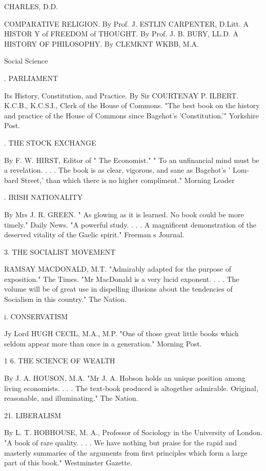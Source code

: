 \documentclass[12pt,leqno]{book}[2005/09/16]
\begin{document}
CHARLES, D.D.

COMPARATIVE RELIGION. By Prof. J. ESTLIN CARPENTER, D.Litt.
A HISTOR Y of FREEDOM of THOUGHT. By Prof. J. B. BURY, LL.D.
A HISTORY OF PHILOSOPHY. By CLEMKNT WKBB, M.A.



Social Science



. PARLIAMENT

Its History, Constitution, and Practice. By Sir COURTENAY P. ILBERT.
K.C.B., K.C.S.I., Clerk of the House of Commons. "The best book on the
history and practice of the House of Commons since Bagehot's 'Constitution.'"
Yorkshire Post.

. THE STOCK EXCHANGE

By F. W. HIRST, Editor of " The Economist." " To an unfinancial mind must
be a revelation. . . . The book is as clear, vigorous, and sane as Bagehot's ' Lom-
bard Street,' than which there is no higher compliment." Morning Leader

. IRISH NATIONALITY

By Mrs J. R. GREEN. " As glowing as it is learned. No book could be more
timely." Daily News. "A powerful study. . . . A magnificent demonstration
of the deserved vitality of the Gaelic spirit." Freeman s Journal.

3. THE SOCIALIST MOVEMENT

RAMSAY MACDONALD, M.T. "Admirably adapted for the purpose of
exposition." The Times. "Mr MacDonald is a very lucid exponent. . . . The
volume will be of great use in dispelling illusions about the tendencies of
Socialism in this country." The Nation.

i. CONSERVATISM

Jy Lord HUGH CECIL, M.A., M.P. "One of those great little books which
seldom appear more than once in a generation." Morning Post.



1 6. THE SCIENCE OF WEALTH

By J. A. HOUSON, M.A. "Mr J. A. Hobson holds an unique position among
living economists. . . . The text-book produced is altogether admirable.
Original, reasonable, and illuminating." The Nation.

21. LIBERALISM

By L. T. HOBHOUSE, M. A., Professor of Sociology in the University of London.
"A book of rare quality. . . . We have nothing but praise for the rapid and
masterly summaries of the arguments from first principles which form a large
part of this book." Westminster Gazette.
\end{document}
